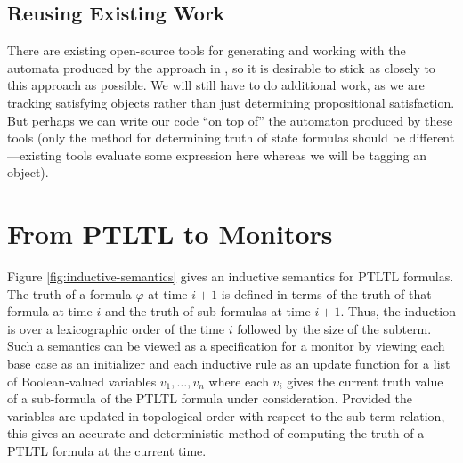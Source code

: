 \documentclass{article}
\newcommand{\ltlform}{\varphi}
\begin{document}
\subsection{Reusing Existing Work}
There are existing open-source tools for generating and working with the automata produced by the approach in \cite{runtime-verif-LTL}, so it is desirable to stick as closely to this approach as possible.  We will still have to do additional work, as we are tracking satisfying objects rather than just determining propositional satisfaction.  But perhaps we can write our code ``on top of'' the automaton produced by these tools (only the method for determining truth of state formulas should be different---existing tools evaluate some expression here whereas we will be tagging an object).

\section{From PTLTL to Monitors}

Figure \ref{fig:inductive-semantics} gives an inductive semantics for PTLTL formulas.  The truth of a formula $\ltlform$ at time $i+1$ is defined in terms of the truth of that formula at time $i$ and the truth of sub-formulas at time $i+1$.  Thus, the induction is over a lexicographic order of the time $i$ followed by the size of the subterm.
 Such a semantics can be viewed as a specification for a monitor by viewing each base case as an initializer and each inductive rule as an update function for a list of Boolean-valued variables $v_1,\ldots,v_n$ where each $v_i$ gives the current truth value of a sub-formula of the PTLTL formula under consideration.  Provided the variables are updated in topological order with respect to the sub-term relation, this gives an accurate and deterministic method of computing the truth of a PTLTL formula at the current time.
\end{document}
